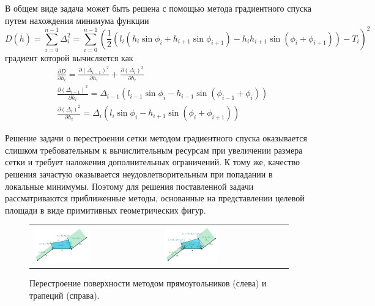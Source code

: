 \documentclass[a4paper,14pt]{extarticle}                     %
\theoremstyle{plain}                                         %
\begin{document}
В общем виде задача может быть решена с помощью метода градиентного спуска путем нахождения минимума функции
\begin{equation}
	D(\overline{h}) = \sum_{i = 0}^{n - 1}{\Delta_i^2} = \sum_{i = 0}^{n - 1}{ \left( \frac{1}{2} \left( l_i(h_i \sin \phi_i + h_{i + 1} \sin \phi_{i+1}) - h_ih_{i + 1} \sin(\phi_i + \phi_{i+1}) \right) - T_i \right)^2}
\end{equation}
градиент которой вычисляется как
\begin{equation}
	\begin{aligned}
		& \frac{\partial D}{\partial h_i} = \frac{\partial (\Delta_{i - 1})^2}{\partial h_i} + \frac{\partial (\Delta_i)^2}{\partial h_i} \\
		& \frac{\partial (\Delta_{i - 1})^2}{\partial h_i} = \Delta_{i - 1} (l_{i - 1} \sin \phi_i - h_{i - 1} \sin(\phi_{i - 1} + \phi_i)) \\
		& \frac{\partial (\Delta_i)^2}{\partial h_i} = \Delta_i (l_i \sin \phi_i - h_{i + 1} \sin(\phi_i + \phi_{i+1}))
	\end{aligned}
\end{equation}

Решение задачи о перестроении сетки методом градиентного спуска оказывается слишком требовательным к вычислительным ресурсам при увеличении размера сетки и требует наложения дополнительных ограничений.
К тому же, качество решения зачастую оказывается неудовлетворительным при попадании в локальные минимумы.
Поэтому для решения поставленной задачи рассматриваются приближенные методы, основанные на представлении целевой площади в виде примитивных геометрических фигур.

\begin{figure}[ht]
\centering
\begin{tabular}{ll}
\includegraphics[width=0.45\textwidth]{pics/text_1_remesh_2d/remesh_rectangles.pdf}
&
\includegraphics[width=0.45\textwidth]{pics/text_1_remesh_2d/remesh_trapeziums.pdf}
\end{tabular}
\singlespacing
{}\caption{Перестроение поверхности методом прямоугольников (слева) и трапеций (справа).}
\label{fig:text_1_remesh_2d_rectangles_and_trapeziums}
\end{figure}
\end{document}
